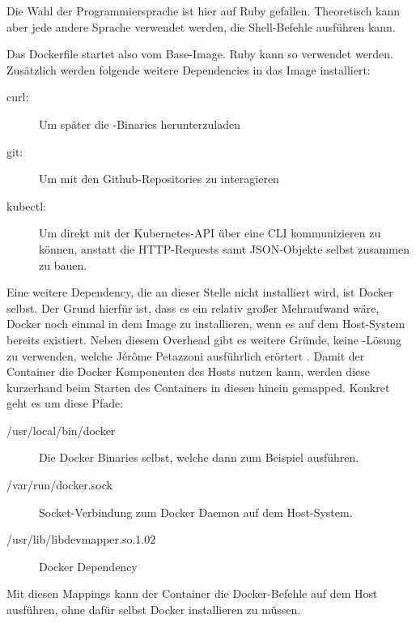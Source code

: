 Die Wahl der Programmiersprache ist hier auf Ruby \cite{ruby} gefallen. Theoretisch kann
aber jede andere Sprache verwendet werden, die Shell-Befehle ausführen kann.

Das Dockerfile startet also vom  Base-Image.
Ruby kann so  verwendet werden. Zusätzlich werden
folgende weitere Dependencies in das Image installiert:
\begin{description}
  \item[curl:] Um später die -Binaries
  herunterzuladen
  \item[git:] Um mit den Github-Repositories zu interagieren
  \item[kubectl:] Um direkt mit der Kubernetes-API über eine CLI kommunizieren
  zu können, anstatt die HTTP-Requests samt JSON-Objekte selbst zusammen zu bauen.
\end{description}

Eine weitere Dependency, die an dieser Stelle nicht installiert wird,
ist Docker selbst. Der Grund hierfür ist, dass es ein relativ großer Mehraufwand
wäre, Docker noch einmal in dem Image zu installieren, wenn es auf dem
Host-System bereits existiert.
Neben diesem Overhead gibt es weitere Gründe, keine
-Lösung zu verwenden, welche Jérôme Petazzoni ausführlich
erörtert \cite{did}.
Damit der Container die Docker Komponenten des Hosts nutzen kann, werden diese
kurzerhand beim Starten des Containers in diesen hinein gemapped.
Konkret geht es um diese Pfade:
\begin{description}
  \item[/usr/local/bin/docker] Die Docker Binaries selbst, welche dann zum Beispiel
   ausführen.
  \item[/var/run/docker.sock] Socket-Verbindung zum Docker Daemon auf
  dem Host-System.
  \item[/usr/lib/libdevmapper.so.1.02] Docker Dependency
\end{description}

Mit diesen Mappings kann der Container die Docker-Befehle auf dem Host
ausführen, ohne
dafür selbst Docker installieren zu müssen.

